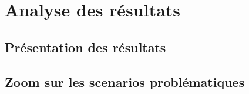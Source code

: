 \chapter{Analyse des résultats}
\label{chap:results_discussion}
\section{Présentation des résultats}
\section{Zoom sur les scenarios problématiques}
